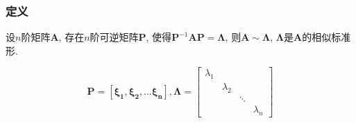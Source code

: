 \subsubsection{定义}
设$ n $阶矩阵$ \bm{A} $, 存在$ n $阶可逆矩阵$ \bm{P} $, 使得$ \bm{P}^{-1}\bm{A}\bm{P}=\bm{\Lambda} $, 则$ \bm{A}\sim \bm{\Lambda} $, $ \bm{\Lambda} $是$ \bm{A} $的相似标准形.\par
\[ \bm{P}=\left[\bm{\xi_1}, \bm{\xi_2},... \bm{\xi_n}\right], \bm{\Lambda} =\begin{bmatrix}
                                                                            \lambda_1 &  &  &  \\
                                                                            & \lambda_2 &  &  \\
                                                                            &  & \ddots &  \\
                                                                            &  &  & \lambda_n
\end{bmatrix}
\]
